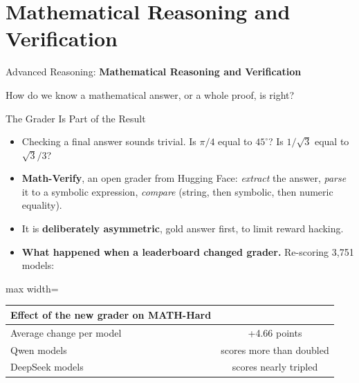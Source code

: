 \section{Mathematical Reasoning and Verification}

\begin{frame}{}
    \LARGE Advanced Reasoning: \textbf{Mathematical Reasoning and Verification}

    \vspace{1em}
    \normalsize How do we know a mathematical answer, or a whole proof, is right?
\end{frame}

\begin{frame}{The Grader Is Part of the Result}
    \begin{itemize}\itemsep0.4em
        \item Checking a final answer sounds trivial. Is $\pi/4$ equal to $45^\circ$? Is $1/\sqrt{3}$ equal to $\sqrt{3}/3$?
        \item \textbf{Math-Verify}, an open grader from Hugging Face: \emph{extract} the answer, \emph{parse} it to a symbolic expression, \emph{compare} (string, then symbolic, then numeric equality).
        \item It is \textbf{deliberately asymmetric}, gold answer first, to limit reward hacking.
        \item \textbf{What happened when a leaderboard changed grader.} Re-scoring 3,751 models:
    \end{itemize}
    \begin{center}
    \small
    \begin{adjustbox}{max width=\linewidth}\begin{tabular}{lc}
        \toprule
        \textbf{Effect of the new grader on MATH-Hard} & \\
        \midrule
        Average change per model & +4.66 points \\
        Qwen models & scores more than doubled \\
        DeepSeek models & scores nearly tripled \\
        \bottomrule
    \end{tabular}\end{adjustbox}
    \end{center}
    \vspace{-0.2em}
\end{frame}

